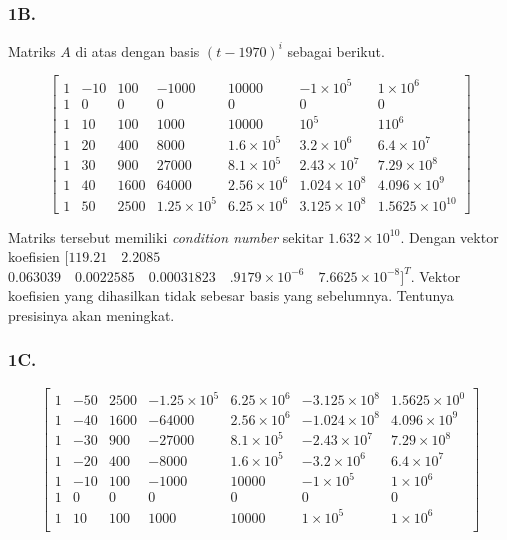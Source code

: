 \documentclass[11pt, a4paper, onecolumn, oneside, final]{report}
\begin{document}
\subsubsection*{1B.}
Matriks $A$ di atas dengan basis $(t - 1970)^i$ sebagai berikut.

$$
\begin{bmatrix}
1 & -10 & 100 & -1000 & 10000 & -1 \times 10^{5} & 1 \times 10^{6} \\
1 & 0 & 0 & 0 & 0 & 0 & 0 \\
1 & 10 & 100 & 1000 & 10000 & 10^{5} & 1 10^{6} \\
1 & 20 & 400 & 8000 & 1.6 \times 10^{5} & 3.2 \times 10^{6} & 6.4 \times 10^{7} \\
1 & 30 & 900 & 27000 & 8.1 \times 10^{5} & 2.43 \times 10^{7} & 7.29 \times 10^{8} \\
1 & 40 & 1600 & 64000 & 2.56 \times 10^{6} & 1.024 \times 10^{8} & 4.096 \times 10^{9} \\
1 & 50 & 2500 & 1.25 \times 10^{5} & 6.25 \times 10^{6} & 3.125 \times 10^{8} & 1.5625 \times 10^{10} 
\end{bmatrix}
$$

Matriks tersebut memiliki \textit{condition number} sekitar $1.632 \times 10^{10}$. Dengan vektor koefisien $[119.21 \quad 2.2085$ $0.063039 \quad 0.0022585 \quad 0.00031823 \quad .9179 \times 10^{-6} \quad 7.6625 \times 10^{-8}]^T$. Vektor koefisien yang dihasilkan tidak sebesar basis yang sebelumnya. Tentunya presisinya akan meningkat.

\subsubsection*{1C.}

$$
\begin{bmatrix}
1 & -50 & 2500 & -1.25 \times 10^{5} & 6.25 \times 10^{6} & -3.125 \times 10^{8} & 1.5625 \times 10^{0} \\
1 & -40 & 1600 & -64000 & 2.56 \times 10^{6} & -1.024 \times 10^{8} & 4.096 \times 10^{9} \\
1 & -30 & 900 & -27000 & 8.1 \times 10^{5} & -2.43 \times 10^{7} & 7.29 \times 10^{8} \\
1 & -20 & 400 & -8000 & 1.6 \times 10^{5} & -3.2 \times 10^{6} & 6.4 \times 10^{7} \\
1 & -10 & 100 & -1000 & 10000 & -1 \times 10^{5} & 1 \times 10^{6} \\
1 & 0 & 0 & 0 & 0 & 0 & 0 \\
1 & 10 & 100 & 1000 & 10000 & 1 \times 10^{5} & 1 \times 10^{6} \\
\end{bmatrix}
$$
\end{document}

